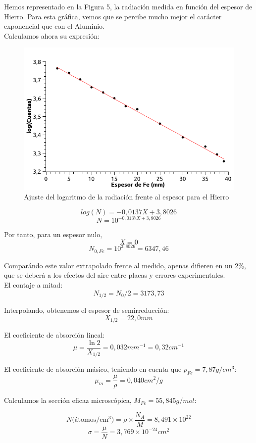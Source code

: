\documentclass[a4paper,12pt,spanish]{article}
\begin{document}
	Hemos representado en la Figura 5, la radiación medida en función del espesor de Hierro. Para esta gráfica, vemos que se percibe mucho mejor el carácter exponencial que con el Aluminio.\\
	
	Calculamos ahora su expresión:
	
	
	\begin{figure}[H]
		\centering
		\includegraphics[width=0.7\linewidth]{images/graficas_practica_4/hierro_ajuste}
		\caption{Ajuste del logaritmo de la radiación frente al espesor para el Hierro}
		\label{fig:hierroajuste}
	\end{figure}


	
	\[ log(N) = -0,0137 X + 3,8026
	\]
	\[ N = 10^{-0,0137 X + 3,8026}
	\]
	
	Por tanto, para un espesor nulo,
	\[ X = 0
	\]
	\[N_{0, Fe} = 10^{3,8026} = 6347,46\]

Comparándo este valor extrapolado frente al medido, apenas difieren en un 2\%, que se deberá a los efectos del aire entre placas y errores experimentales. \\


El contaje a mitad:
\[N_{1/2} = N_0 /2 = 3173,73
\]


Interpolando, obtenemos el espesor de semirreducción:
\[ X_{1/2} = 22,0\si{mm}
\]

El coeficiente de absorción lineal:
\[ \mu = \frac{\ln 2}{X_{1/2}} = 0,032 \si{mm^{-1}} = 0,32\si{cm^{-1}}
\]

El coeficiente de absorción másico, teniendo en cuenta que $\rho_{Fe} = 7,87\si{g/cm^3}$:
\[ \mu_m = \frac{\mu}{\rho} = 0,040 \si{cm^2/g}
\]

Calculamos la sección eficaz microscópica, $M_{Fe} = 55,845 \si{g/mol}$:

\[ N \text{(átomos/cm$^3$)} = \rho \times \frac{N_A}{M} = 8,491\times 10^{22} 
\]
\[ \sigma = \frac{\mu}{N} = 3,769\times 10^{-24} \si{cm^2}
\]
\end{document}
